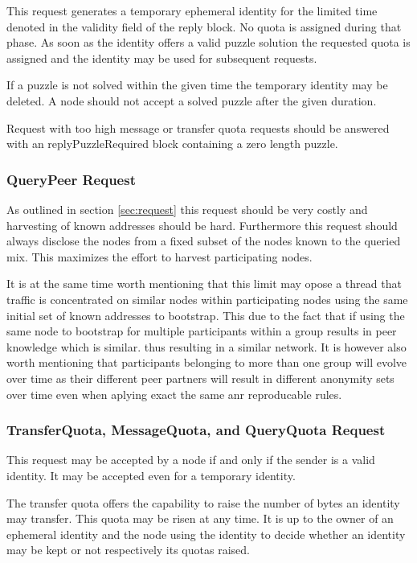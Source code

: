 This request generates a temporary ephemeral identity for the limited time denoted in the validity field of the reply block. No quota is assigned during that phase. As soon as the identity offers a valid puzzle solution the requested quota is assigned and the identity may be used for subsequent requests.

If a puzzle is not solved within the given time the temporary identity may be deleted. A node should not accept a solved puzzle after the given duration. 

Request with too high message or transfer quota requests should be answered with an replyPuzzleRequired block containing a zero length puzzle.

\subsubsection{QueryPeer Request}
As outlined in section \ref{sec:request} this request should be very costly and harvesting of known addresses should be hard. Furthermore this request should always  disclose the nodes from a fixed subset of the nodes known to the queried mix. This maximizes the effort to harvest participating nodes.

It is at the same time worth mentioning that this limit may opose a thread that traffic is concentrated on similar nodes within participating nodes using the same initial set of known addresses to bootstrap. This due to the fact that if using the same node to bootstrap for multiple participants within a group results in peer knowledge which is similar. thus resulting in a similar network. It is however also worth mentioning that participants belonging to more than one group will evolve over time as their different peer partners will result in different anonymity sets over time even when aplying exact the same anr reproducable rules.


\subsubsection{TransferQuota, MessageQuota,  and QueryQuota Request}
This request may be accepted by a node if and only if the sender is a valid identity. It may be accepted even for a temporary identity.

The transfer quota offers the capability to raise the number of bytes an identity may transfer. This quota may be risen at any time. It is up to the owner of an ephemeral identity and the node using the identity to decide whether an identity may be kept or not respectively its quotas raised.

